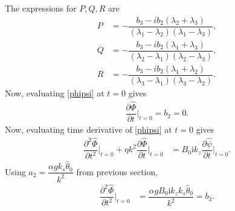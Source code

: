 \documentclass[12pt,psfig]{article}
\begin{document}
The expressions for $P,Q,R$ are
\begin{align*}
P&=-\dfrac{b_3-i b_2 (\lambda_2+ \lambda_3)}{(\lambda_1-\lambda_2) (\lambda_1-\lambda_3)},\\
Q&=-\dfrac{b_3-i b_2 (\lambda_1+ \lambda_3)}{(\lambda_2-\lambda_1) (\lambda_2-\lambda_3)},\\
R&=-\dfrac{b_3-i b_2 (\lambda_1+ \lambda_2)}{(\lambda_3-\lambda_1) (\lambda_3-\lambda_2)}.
\end{align*}
Now, evaluating \eqref{phipsi} at $t=0$ gives
\begin{align}
\dfrac{\partial \hat{\Phi}}{\partial t}\bigg|_{t=0}=b_2=0. \label{dPhidt}
\end{align}
Now, evaluating time derivative of \eqref{phipsi} at $t=0$ gives
\begin{align*}
\dfrac{\partial^2 \hat{\Phi}}{\partial t^2}\bigg|_{t=0}+\eta k^2\dfrac{\partial \hat{\Phi}}{\partial t}\bigg|_{t=0}&=B_0\mathrm{i}k_z\dfrac{\partial \hat{\psi}}{\partial t}\bigg|_{t=0}. 
\end{align*}
Using $a_2=\dfrac{\alpha g k_s \hat{\theta}_0}{k^2}$ from previous section,
\begin{align}
\dfrac{\partial^2 \hat{\Phi}}{\partial t^2}\bigg|_{t=0}&=\dfrac{\alpha g B_0\mathrm{i}k_zk_s \hat{\theta}_0}{k^2}=b_3. \label{d2Phidt2}
\end{align}
\end{document}
